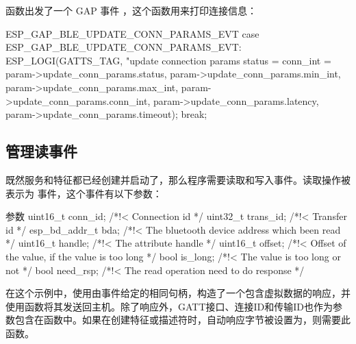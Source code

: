 \documentclass[lang=cn,newtx,10pt,scheme=chinese]{elegantbook}
\begin{document}
 函数出发了一个 GAP 事件 ，这个函数用来打印连接信息：

\begin{mycode}{ESP\_GAP\_BLE\_UPDATE\_CONN\_PARAMS\_EVT}
    case ESP_GAP_BLE_UPDATE_CONN_PARAMS_EVT:
         ESP_LOGI(GATTS_TAG, "update connection params status = %
                  conn_int = %
                  param->update_conn_params.status,
                  param->update_conn_params.min_int,
                  param->update_conn_params.max_int,
                  param->update_conn_params.conn_int,
                  param->update_conn_params.latency,
                  param->update_conn_params.timeout);
         break;
\end{mycode}

\subsection{管理读事件}

既然服务和特征都已经创建并启动了，那么程序需要读取和写入事件。读取操作被表示为  事件，这个事件有以下参数：

\begin{mycode}{参数}
uint16_t conn_id;          /*!< Connection id */
uint32_t trans_id;         /*!< Transfer id */
esp_bd_addr_t bda;         /*!< The bluetooth device address which been read */
uint16_t handle;           /*!< The attribute handle */
uint16_t offset;           /*!< Offset of the value, if the value is too long */
bool is_long;              /*!< The value is too long or not */
bool need_rsp;             /*!< The read operation need to do response */
\end{mycode}

在这个示例中，使用由事件给定的相同句柄，构造了一个包含虚拟数据的响应，并使用函数将其发送回主机。除了响应外，GATT接口、连接ID和传输ID也作为参数包含在函数中。如果在创建特征或描述符时，自动响应字节被设置为，则需要此函数。
\end{document}
